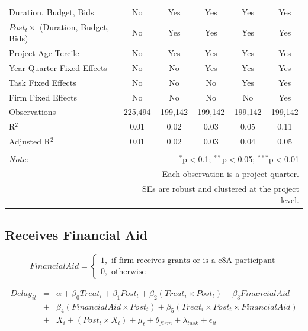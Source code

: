 \documentclass[]{article}
\begin{document}
\begin{table}[H]
\begin{tabular}{@{\extracolsep{-2pt}}lccccc}
Duration, Budget, Bids & No & Yes & Yes & Yes & Yes \\ 
$Post_t \times $  (Duration, Budget, Bids) & No & Yes & Yes & Yes & Yes \\ 
Project Age Tercile & No & Yes & Yes & Yes & Yes \\ 
Year-Quarter Fixed Effects & No & No & Yes & Yes & Yes \\ 
Task Fixed Effects & No & No & No & Yes & Yes \\ 
Firm Fixed Effects & No & No & No & No & Yes \\ 
Observations & 225,494 & 199,142 & 199,142 & 199,142 & 199,142 \\ 
R$^{2}$ & 0.01 & 0.02 & 0.03 & 0.05 & 0.11 \\ 
Adjusted R$^{2}$ & 0.01 & 0.02 & 0.03 & 0.04 & 0.05 \\ 
\hline 
\hline \\[-1.8ex] 
\textit{Note:}  & \multicolumn{5}{r}{$^{*}$p$<$0.1; $^{**}$p$<$0.05; $^{***}$p$<$0.01} \\ 
 & \multicolumn{5}{r}{Each observation is a project-quarter.} \\ 
 & \multicolumn{5}{r}{SEs are robust and clustered at the project level.} \\ 
\end{tabular} 
\end{table}

\hypertarget{receives-financial-aid}{%
\subsection{Receives Financial Aid}\label{receives-financial-aid}}

\[ FinancialAid = \begin{cases} 1, \text{ if firm receives grants or is a c8A participant}\\
0, \text{ otherwise} \end{cases}\]

\[ \begin{aligned}
Delay_{it} &=& \alpha+\beta_0 Treat_i + \beta_1 Post_t + \beta_2 (Treat_i \times Post_t) +\beta_3 FinancialAid \\
&+& \beta_4 (FinancialAid \times Post_t) + \beta_5 (Treat_i \times Post_t \times FinancialAid) \\ 
&+&X_i + (Post_t \times X_i) + \mu_t + \theta_{firm} + \lambda_{task}+ \epsilon_{it}
\end{aligned}\]
\end{document}

